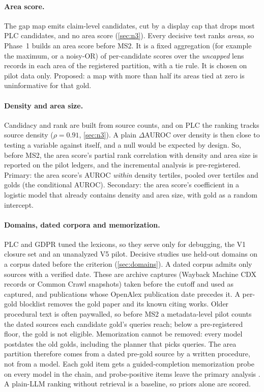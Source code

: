 \paragraph{Area score.} \evobs{} The gap map emits claim-level candidates, cut by a display cap
that drops most PLC candidates, and no area score (\cref{sec:n3}). \evfut{} Every decisive test
ranks \emph{areas}, so Phase~1 builds an area score before MS2. It is a fixed aggregation (for
example the maximum, or a noisy-OR) of per-candidate scores over the \emph{uncapped} lens records in
each area of the registered partition, with a tie rule. It is chosen on pilot data only. Proposed: a map with
more than half its areas tied at zero is uninformative for that gold.

\paragraph{Density and area size.} \evint{} Candidacy and rank are built from source counts, and on
PLC the ranking tracks source density ($\rho = 0.91$, \cref{sec:n3}). A plain $\Delta$AUROC over
density is then close to testing a variable against itself, and a null would be expected by design.
\evfut{} So, before MS2, the area score's partial rank correlation with density and area size is
reported on the pilot ledgers, and the incremental analysis is pre-registered. Primary: the area
score's AUROC \emph{within} density tertiles, pooled over tertiles and golds (the conditional
AUROC). Secondary: the area score's coefficient in a logistic model that already contains density
and area size, with gold as a random intercept.

\paragraph{Domains, dated corpora and memorization.} PLC and GDPR tuned the lexicons, so they serve
only for debugging, the V1 closure set and an unanalyzed V5 pilot. Decisive studies use held-out
domains on a corpus dated before the criterion (\cref{sec:domains}). \evfut{} A dated corpus admits
only sources with a verified date. These are archive captures (Wayback Machine CDX records or
Common Crawl snapshots) taken before the cutoff and used as captured, and publications whose
OpenAlex publication date precedes it. A per-gold blocklist removes the gold paper and its known
citing works. Older procedural text is often paywalled, so before MS2 a metadata-level pilot counts
the dated sources each candidate gold's queries reach; below a pre-registered floor, the gold is not
eligible. \evint{} Memorization cannot be removed: every model postdates the old golds, including
the planner that picks queries. The area partition therefore comes from a dated pre-gold source
by a written procedure, not from a model. Each gold item gets a guided-completion memorization probe
on every model in the chain, and probe-positive items leave the primary analysis
\parencite{golchin2023time,sainz2023nlp}. A plain-LLM ranking without retrieval is a baseline, so
priors alone are scored.

